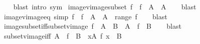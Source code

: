 \begin{isabellebody}
%
\isadelimproof
\ \ %
\endisadelimproof
%
\isatagproof
{}\isamarkupfalse%
\ {\isacharparenleft}{\kern0pt}blast\ intro{\isacharcolon}{\kern0pt}\ sym{\isacharparenright}{\kern0pt}%
\endisatagproof
{\isafoldproof}%
%
\isadelimproof
\isanewline
%
\endisadelimproof
\isanewline
{}\isamarkupfalse%
\ image{\isacharunderscore}{\kern0pt}vimage{\isacharunderscore}{\kern0pt}subset{\isacharcolon}{\kern0pt}\ {\isachardoublequoteopen}f\ {\isacharbackquote}{\kern0pt}\ {\isacharparenleft}{\kern0pt}f\ {\isacharminus}{\kern0pt}{\isacharbackquote}{\kern0pt}\ A{\isacharparenright}{\kern0pt}\ {\isasymsubseteq}\ A{\isachardoublequoteclose}\isanewline
%
\isadelimproof
\ \ %
\endisadelimproof
%
\isatagproof
{}\isamarkupfalse%
\ blast%
\endisatagproof
{\isafoldproof}%
%
\isadelimproof
\isanewline
%
\endisadelimproof
\isanewline
{}\isamarkupfalse%
\ image{\isacharunderscore}{\kern0pt}vimage{\isacharunderscore}{\kern0pt}eq\ {\isacharbrackleft}{\kern0pt}simp{\isacharbrackright}{\kern0pt}{\isacharcolon}{\kern0pt}\ {\isachardoublequoteopen}f\ {\isacharbackquote}{\kern0pt}\ {\isacharparenleft}{\kern0pt}f\ {\isacharminus}{\kern0pt}{\isacharbackquote}{\kern0pt}\ A{\isacharparenright}{\kern0pt}\ {\isacharequal}{\kern0pt}\ A\ {\isasyminter}\ range\ f{\isachardoublequoteclose}\isanewline
%
\isadelimproof
\ \ %
\endisadelimproof
%
\isatagproof
{}\isamarkupfalse%
\ blast%
\endisatagproof
{\isafoldproof}%
%
\isadelimproof
\isanewline
%
\endisadelimproof
\isanewline
{}\isamarkupfalse%
\ image{\isacharunderscore}{\kern0pt}subset{\isacharunderscore}{\kern0pt}iff{\isacharunderscore}{\kern0pt}subset{\isacharunderscore}{\kern0pt}vimage{\isacharcolon}{\kern0pt}\ {\isachardoublequoteopen}f\ {\isacharbackquote}{\kern0pt}\ A\ {\isasymsubseteq}\ B\ {\isasymlongleftrightarrow}\ A\ {\isasymsubseteq}\ f\ {\isacharminus}{\kern0pt}{\isacharbackquote}{\kern0pt}\ B{\isachardoublequoteclose}\isanewline
%
\isadelimproof
\ \ %
\endisadelimproof
%
\isatagproof
{}\isamarkupfalse%
\ blast%
\endisatagproof
{\isafoldproof}%
%
\isadelimproof
\isanewline
%
\endisadelimproof
\isanewline
{}\isamarkupfalse%
\ subset{\isacharunderscore}{\kern0pt}vimage{\isacharunderscore}{\kern0pt}iff{\isacharcolon}{\kern0pt}\ {\isachardoublequoteopen}A\ {\isasymsubseteq}\ f\ {\isacharminus}{\kern0pt}{\isacharbackquote}{\kern0pt}\ B\ {\isasymlongleftrightarrow}\ {\isacharparenleft}{\kern0pt}{\isasymforall}x{\isasymin}A{\isachardot}{\kern0pt}\ f\ x\ {\isasymin}\ B{\isacharparenright}{\kern0pt}{\isachardoublequoteclose}\isanewline

\end{isabellebody}
